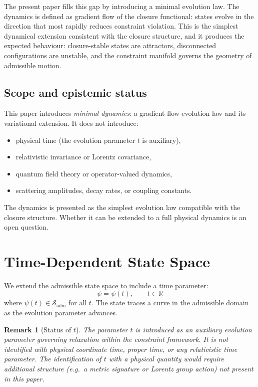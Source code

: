 \documentclass[12pt]{article}
\newtheorem{remark}[theorem]{Remark}
\newcommand{\Sadm}{\mathcal{S}_{\mathrm{adm}}}
\begin{document}
The present paper fills this gap by introducing a minimal evolution law. The dynamics is defined as gradient flow of the closure functional: states evolve in the direction that most rapidly reduces constraint violation. This is the simplest dynamical extension consistent with the closure structure, and it produces the expected behaviour: closure-stable states are attractors, disconnected configurations are unstable, and the constraint manifold governs the geometry of admissible motion.

\subsection*{Scope and epistemic status}

This paper introduces \textit{minimal dynamics}: a gradient-flow evolution law and its variational extension. It does not introduce:
\begin{itemize}
    \item physical time (the evolution parameter $t$ is auxiliary),
    \item relativistic invariance or Lorentz covariance,
    \item quantum field theory or operator-valued dynamics,
    \item scattering amplitudes, decay rates, or coupling constants.
\end{itemize}

The dynamics is presented as the simplest evolution law compatible with the closure structure. Whether it can be extended to a full physical dynamics is an open question.

\section{Time-Dependent State Space}\label{sec:timedep}

We extend the admissible state space to include a time parameter:
\begin{equation}\label{eq:timedep}
    \psi = \psi(t), \qquad t \in \mathbb{R}
\end{equation}
where $\psi(t) \in \Sadm$ for all $t$. The state traces a curve in the admissible domain as the evolution parameter advances.

\begin{remark}[Status of $t$]
The parameter $t$ is introduced as an auxiliary evolution parameter governing relaxation within the constraint framework. It is not identified with physical coordinate time, proper time, or any relativistic time parameter. The identification of $t$ with a physical quantity would require additional structure (e.g.\ a metric signature or Lorentz group action) not present in this paper.
\end{remark}
\end{document}
